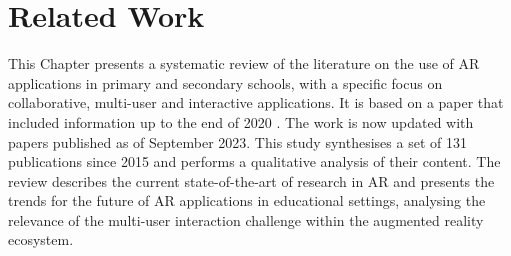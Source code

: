 





\ifpdf
\graphicspath{{Sota/figures/PNG/}{./figures/}{Sota/figures/PDF/}{Sota/figures/}}
\else
\graphicspath{{Sota/figures/EPS/}{Sota/figures/}{./figures}}
\fi

\newcommand{\papersWithNumStudentInfo}[0]{103 }
\newcommand{\papersWithEvaluation}[0]{65 }
\newcommand{\hardwareHMD}[0]{8 }
\newcommand{\papersAfterTwentyEighteen}[0]{104 }
\newcommand{\allPapers}[0]{3070 }
\newcommand{\duplPapers}[0]{395 }
\newcommand{\papersCheckAbstract}[0]{2675 }
\newcommand{\papersToRead}[0]{359 }
\newcommand{\papersExludedAfterReading}[0]{228 }
\newcommand{\papersSelected}[0]{131 }
\newcommand{\papersMultiuser}[0]{23 }
\newcommand{\papersCollab}[0]{16 }
\newcommand{\papersGames}[0]{17 }

\chapter{Related Work}
\label{chap:sota}

This Chapter presents a systematic review of the literature on the use of AR applications in primary and secondary schools, with a specific focus on collaborative, multi-user and interactive applications. It is based on a paper that included information up to the end of 2020 \citep{10.3897/jucs.76535}. The work is now updated with papers published as of September 2023. This study synthesises a set of 131 publications since 2015 and performs a qualitative analysis of their content. The review describes the current state-of-the-art of research in AR and presents the trends for the future of AR applications in educational settings, analysing the relevance of the multi-user interaction challenge within the augmented reality ecosystem.


